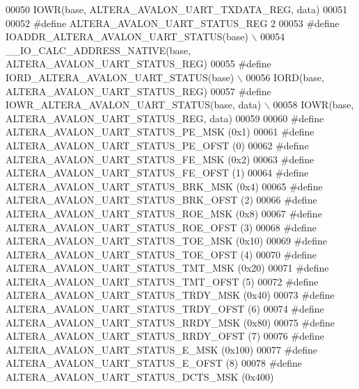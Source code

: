 \begin{DoxyCode}
00050 \textcolor{preprocessor}{        IOWR(base, ALTERA\_AVALON\_UART\_TXDATA\_REG, data)}
00051 
00052 \textcolor{preprocessor}{#define ALTERA\_AVALON\_UART\_STATUS\_REG                 2}
00053 \textcolor{preprocessor}{#define IOADDR\_ALTERA\_AVALON\_UART\_STATUS(base)        \(\backslash\)}
00054 \textcolor{preprocessor}{        \_\_IO\_CALC\_ADDRESS\_NATIVE(base, ALTERA\_AVALON\_UART\_STATUS\_REG)}
00055 \textcolor{preprocessor}{#define IORD\_ALTERA\_AVALON\_UART\_STATUS(base)          \(\backslash\)}
00056 \textcolor{preprocessor}{        IORD(base, ALTERA\_AVALON\_UART\_STATUS\_REG) }
00057 \textcolor{preprocessor}{#define IOWR\_ALTERA\_AVALON\_UART\_STATUS(base, data)    \(\backslash\)}
00058 \textcolor{preprocessor}{        IOWR(base, ALTERA\_AVALON\_UART\_STATUS\_REG, data)}
00059 
00060 \textcolor{preprocessor}{#define ALTERA\_AVALON\_UART\_STATUS\_PE\_MSK              (0x1)}
00061 \textcolor{preprocessor}{#define ALTERA\_AVALON\_UART\_STATUS\_PE\_OFST             (0)}
00062 \textcolor{preprocessor}{#define ALTERA\_AVALON\_UART\_STATUS\_FE\_MSK              (0x2)}
00063 \textcolor{preprocessor}{#define ALTERA\_AVALON\_UART\_STATUS\_FE\_OFST             (1)}
00064 \textcolor{preprocessor}{#define ALTERA\_AVALON\_UART\_STATUS\_BRK\_MSK             (0x4)}
00065 \textcolor{preprocessor}{#define ALTERA\_AVALON\_UART\_STATUS\_BRK\_OFST            (2)}
00066 \textcolor{preprocessor}{#define ALTERA\_AVALON\_UART\_STATUS\_ROE\_MSK             (0x8)}
00067 \textcolor{preprocessor}{#define ALTERA\_AVALON\_UART\_STATUS\_ROE\_OFST            (3)}
00068 \textcolor{preprocessor}{#define ALTERA\_AVALON\_UART\_STATUS\_TOE\_MSK             (0x10)}
00069 \textcolor{preprocessor}{#define ALTERA\_AVALON\_UART\_STATUS\_TOE\_OFST            (4)}
00070 \textcolor{preprocessor}{#define ALTERA\_AVALON\_UART\_STATUS\_TMT\_MSK             (0x20)}
00071 \textcolor{preprocessor}{#define ALTERA\_AVALON\_UART\_STATUS\_TMT\_OFST            (5)}
00072 \textcolor{preprocessor}{#define ALTERA\_AVALON\_UART\_STATUS\_TRDY\_MSK            (0x40)}
00073 \textcolor{preprocessor}{#define ALTERA\_AVALON\_UART\_STATUS\_TRDY\_OFST           (6)}
00074 \textcolor{preprocessor}{#define ALTERA\_AVALON\_UART\_STATUS\_RRDY\_MSK            (0x80)}
00075 \textcolor{preprocessor}{#define ALTERA\_AVALON\_UART\_STATUS\_RRDY\_OFST           (7)}
00076 \textcolor{preprocessor}{#define ALTERA\_AVALON\_UART\_STATUS\_E\_MSK               (0x100)}
00077 \textcolor{preprocessor}{#define ALTERA\_AVALON\_UART\_STATUS\_E\_OFST              (8)}
00078 \textcolor{preprocessor}{#define ALTERA\_AVALON\_UART\_STATUS\_DCTS\_MSK            (0x400)}

\end{DoxyCode}

